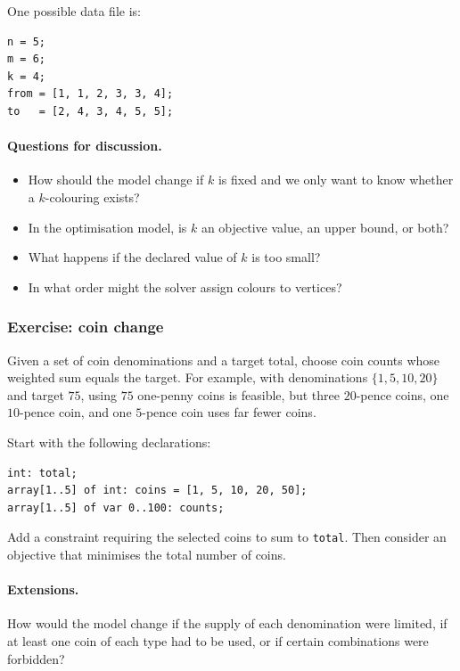 \documentclass[11pt]{article}
\begin{document}
One possible data file is:

\begin{verbatim}
n = 5;
m = 6;
k = 4;
from = [1, 1, 2, 3, 3, 4];
to   = [2, 4, 3, 4, 5, 5];
\end{verbatim}

\paragraph{Questions for discussion.}
\begin{itemize}
    \item How should the model change if $k$ is fixed and we only want to know
    whether a $k$-colouring exists?
    \item In the optimisation model, is $k$ an objective value, an upper bound,
    or both?
    \item What happens if the declared value of $k$ is too small?
    \item In what order might the solver assign colours to vertices?
\end{itemize}

\subsubsection{Exercise: coin change}

Given a set of coin denominations and a target total, choose coin counts whose
weighted sum equals the target. For example, with denominations
$\{1,5,10,20\}$ and target $75$, using $75$ one-penny coins is feasible, but
three $20$-pence coins, one $10$-pence coin, and one $5$-pence coin uses far
fewer coins.

Start with the following declarations:

\begin{verbatim}
int: total;
array[1..5] of int: coins = [1, 5, 10, 20, 50];
array[1..5] of var 0..100: counts;
\end{verbatim}

Add a constraint requiring the selected coins to sum to \texttt{total}. Then
consider an objective that minimises the total number of coins.

\paragraph{Extensions.}
How would the model change if the supply of each denomination were limited, if
at least one coin of each type had to be used, or if certain combinations were
forbidden?
\end{document}
